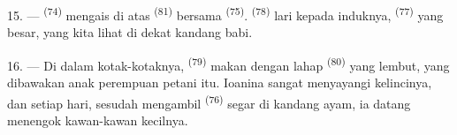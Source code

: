 15. ---  \textsuperscript{(74)} mengais di atas
 \textsuperscript{(81)} bersama  \textsuperscript{(75)}. 
\textsuperscript{(78)} lari kepada induknya, 
\textsuperscript{(77)} yang besar, yang kita lihat di dekat kandang
babi.

16. --- Di dalam kotak-kotaknya, 
\textsuperscript{(79)} makan dengan lahap 
\textsuperscript{(80)} yang lembut, yang dibawakan anak perempuan
petani itu. Ioanina sangat menyayangi kelincinya, dan setiap hari,
sesudah mengambil  \textsuperscript{(76)} segar di
kandang ayam, ia datang menengok kawan-kawan kecilnya.

\VUsaut{6.0mm}
\VUfilet{22mm}
